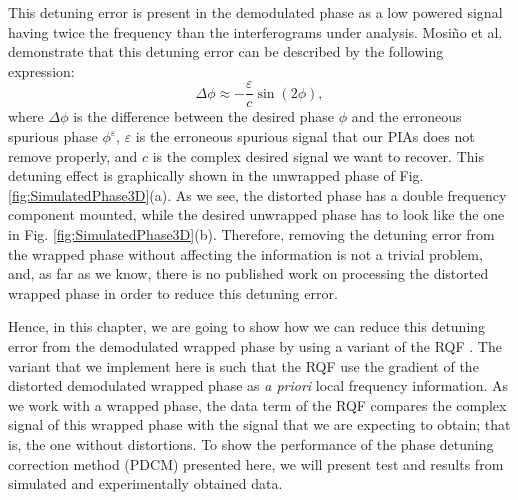 This detuning error is present in the demodulated phase as a low powered 
signal having twice the frequency than the interferograms under analysis.
Mosi\~no et al. \cite{Mosino:09} demonstrate that this detuning error can be 
described by the following expression: 
\begin{equation}\label{Eq:DetuningError}
	\Delta \phi \approx - \frac{\varepsilon}{c} \sin(2\phi),
\end{equation}
where $\Delta \phi$ is the difference between the desired phase $\phi$ and the 
erroneous spurious phase $\phi^\varepsilon$, $\varepsilon$ is the erroneous 
spurious signal that our PIAs does not remove properly, and $c$ is the complex 
desired signal we want to recover. This detuning effect is graphically shown in 
the unwrapped phase of Fig. \ref{fig:SimulatedPhase3D}(a). As we see, the 
distorted phase has a double frequency component mounted, while the desired 
unwrapped phase has to look like the one in Fig. \ref{fig:SimulatedPhase3D}(b). 
Therefore, removing the detuning error from the wrapped phase without affecting 
the information is not a trivial problem, and, as far as we know, there is no 
published work on processing the distorted wrapped phase in order to reduce 
this detuning error.

Hence, in this chapter, we are going to show how we can reduce this detuning 
error from the demodulated wrapped phase by using a variant of the RQF 
\cite{RQF}. The variant that we implement here is 
such that the RQF use the gradient of the distorted demodulated wrapped 
phase as \emph{a priori} local frequency information. As we work with a 
wrapped phase, the data term of the RQF compares the complex signal of 
this wrapped phase with the signal that we are expecting to obtain; that is, 
the one without distortions.
To show the performance of the phase detuning correction method (PDCM)
presented here, we will present test and results from simulated and 
experimentally obtained data.


